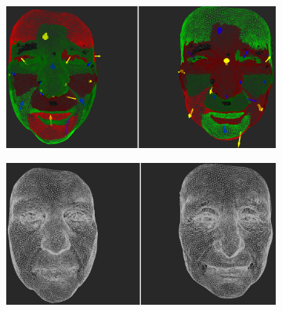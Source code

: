 \begin{figure}[h]
\centering
\begin{subfigure}{0.49\textwidth}
\includegraphics[width=\textwidth]{./img-study/pair3.PNG}
\caption{}
\label{fig:study-1-3}
\end{subfigure}
\begin{subfigure}{0.49\textwidth}
\includegraphics[width=\textwidth]{./img-study/pair1.PNG}
\caption{}
\label{fig:study-1-1}
\end{subfigure}


\end{figure}
